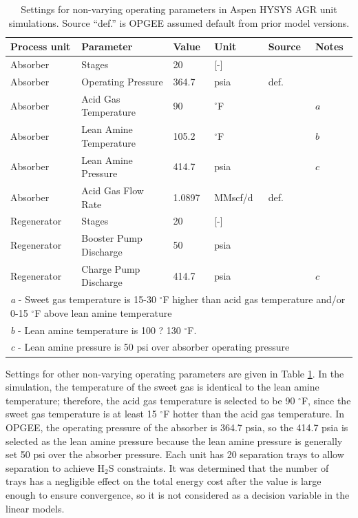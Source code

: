 \documentclass[11pt]{report}
\begin{document}
\begin{table}
\begin{scriptsize}
\caption{Settings for non-varying operating parameters in Aspen HYSYS AGR unit simulations. Source ``def.'' is OPGEE assumed default from prior model versions.}
\label{tab:AGR_Aspen_Settings}
\begin{tabular*}{0.95\columnwidth}{p{}p{}p{}p{}p{}p{}}
\toprule
Process unit & Parameter & Value & Unit & Source & Notes \\
\midrule
Absorber &	Stages 				&	20 		& 	[-]		&	 	&\\
Absorber &	Operating Pressure 		&	364.7 	&	psia 		& def.	 	& \\
Absorber &	Acid Gas Temperature 	&	90 		&	$^\circ$F 		&	\cite{Manning1991} 	& $a$ \\
Absorber &	Lean Amine Temperature 	&	105.2 	&	$^\circ$F 		& 	\cite{Manning1991} 	& $b$\\
Absorber &	Lean Amine Pressure 	&	414.7 	&	psia 		&	\cite{Manning1991}	& $c$ \\
Absorber &	Acid Gas Flow Rate 		&	1.0897 	&	MMscf/d 	&	def.	& \\
\midrule
Regenerator &	Stages 				&	20 		&	[-] 		&		&\\
Regenerator &	Booster Pump Discharge 	&	50 		&	psia 		&	\cite{Manning1991}	& \\
Regenerator &	Charge Pump Discharge 	&	414.7 	&	psia 		&	\cite{Manning1991}	& $c$ \\
\bottomrule
\multicolumn{6}{p{0.95\columnwidth}}{\emph{a} - Sweet gas temperature is 15-30 $^\circ$F higher than acid gas temperature and/or 0-15 $^\circ$F above lean amine temperature}\\
\multicolumn{6}{p{0.95\columnwidth}}{\emph{b} - Lean amine temperature is 100 ? 130 $^\circ$F.}\\
\multicolumn{6}{p{0.95\columnwidth}}{\emph{c} - Lean amine pressure is 50 psi over absorber operating pressure}\\
\end{tabular*}
\end{scriptsize}
\end{table}

Settings for other non-varying operating parameters are given in Table \ref{tab:AGR_Aspen_Settings}. In the simulation, the temperature of the sweet gas is identical to the lean amine temperature; therefore, the acid gas temperature is selected to be 90 $^\circ$F, since the sweet gas temperature is at least 15 $^\circ$F hotter than the acid gas temperature. In OPGEE, the operating pressure of the absorber is 364.7 psia, so the 414.7 psia is selected as the lean amine pressure because the lean amine pressure is generally set 50 psi over the absorber pressure. Each unit has 20 separation trays to allow separation to achieve H$_2$S constraints. It was determined that the number of trays has a negligible effect on the total energy cost after the value is large enough to ensure convergence, so it is not considered as a decision variable in the linear models. 
\end{document}
